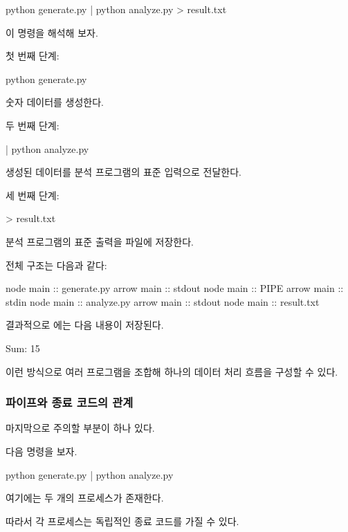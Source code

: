 \begin{dhkzsh}
python generate.py | python analyze.py > result.txt
\end{dhkzsh}

이 명령을 해석해 보자.

첫 번째 단계:

\begin{dhkzsh}
python generate.py
\end{dhkzsh}

숫자 데이터를 생성한다.

두 번째 단계:
\begin{dhkzsh}
| python analyze.py
\end{dhkzsh}

생성된 데이터를 분석 프로그램의 표준 입력으로 전달한다.

세 번째 단계:

\begin{dhkzsh}
> result.txt
\end{dhkzsh}

분석 프로그램의 표준 출력을 파일에 저장한다.

전체 구조는 다음과 같다:

\begin{dhkbranch}[in=8]
node main :: generate.py
arrow main :: stdout
node main :: PIPE
arrow main :: stdin
node main :: analyze.py
arrow main :: stdout
node main :: result.txt
\end{dhkbranch}

결과적으로 에는 다음 내용이 저장된다.

\begin{dhkzsh}
Sum: 15
\end{dhkzsh}

이런 방식으로 여러 프로그램을 조합해 하나의 데이터 처리 흐름을 구성할 수 있다.

\subsubsection{파이프와 종료 코드의 관계}

마지막으로 주의할 부분이 하나 있다.

다음 명령을 보자.

\begin{dhkzsh}
python generate.py | python analyze.py
\end{dhkzsh}

여기에는 두 개의 프로세스가 존재한다.

따라서 각 프로세스는 독립적인 종료 코드를 가질 수 있다.

